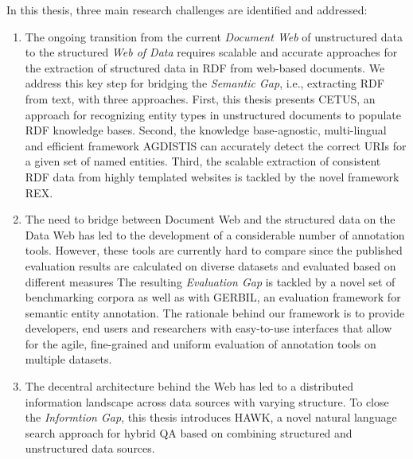 In this thesis, three main research challenges are identified and addressed:
\begin{enumerate}
\item 
The ongoing transition from the current \emph{Document Web} of unstructured data to the structured \emph{Web of Data} requires scalable and accurate approaches for the extraction of structured data in \ac{RDF} from web-based documents.
We address this key step for bridging the \emph{Semantic Gap}, i.e., extracting RDF from text, with three approaches.
First, this thesis presents CETUS, an approach for recognizing entity types in unstructured documents to populate RDF knowledge bases. 
Second, the knowledge base-agnostic, multi-lingual and efficient framework AGDISTIS can accurately detect the correct URIs for a given set of named entities.
Third, the scalable extraction of consistent \ac{RDF} data from highly templated websites is tackled by the novel framework REX.
\item 
The need to bridge between Document Web and the structured data on the Data Web has led to the development of a considerable number of annotation tools. 
However, these tools are currently hard to compare since the published evaluation results are calculated on diverse datasets and evaluated based on different measures
The resulting \emph{Evaluation Gap} is tackled by a novel set of benchmarking corpora as well as with GERBIL, an evaluation framework for semantic entity annotation. 
The rationale behind our framework is to provide developers, end users and researchers with easy-to-use interfaces that allow for the agile, fine-grained and uniform evaluation of annotation tools on multiple datasets.
\item 
The decentral architecture behind the Web has led to a distributed information landscape across data sources with varying structure. 
To close the \emph{Informtion Gap},  this thesis introduces HAWK, a novel natural language search approach for hybrid \ac{QA} based on combining structured and unstructured data sources.
\end{enumerate}

